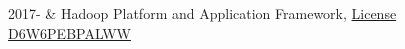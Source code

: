 \documentclass[]{cv-roald}
\begin{document}
\begin{tabularcv}
    2017-       &   
                    \newline Hadoop Platform and Application Framework, \href{https://www.coursera.org/account/accomplishments/verify/D6W6PEBPALWW}{License D6W6PEBPALWW}
\end{tabularcv}
\end{document}
